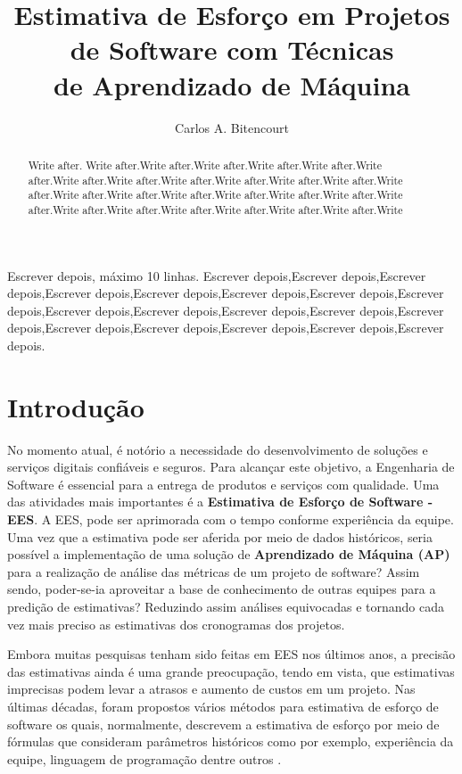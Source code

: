 \documentclass[12pt]{article}
\title{Estimativa de Esforço em Projetos de Software com Técnicas\\ de Aprendizado de Máquina}
\author{Carlos A. Bitencourt\inst{1}}
\begin{document}
\maketitle

\begin{abstract}
  Write after. Write after.Write after.Write after.Write after.Write after.Write after.Write after.Write after.Write after.Write after.Write after.Write after.Write after.Write after.Write after.Write after.Write after.Write after.Write after.Write after.Write after.Write after.Write after.Write after.Write after.Write after.Write
\end{abstract}

\begin{resumo}
  Escrever depois, máximo 10 linhas. Escrever depois,Escrever depois,Escrever depois,Escrever depois,Escrever depois,Escrever depois,Escrever depois,Escrever depois,Escrever depois,Escrever depois,Escrever depois,Escrever depois,Escrever depois,Escrever depois,Escrever depois,Escrever depois,Escrever depois,Escrever depois.

\end{resumo}

\section{Introdução}

No momento atual, é notório a necessidade do desenvolvimento de soluções e serviços digitais confiáveis e seguros. Para alcançar este objetivo, a Engenharia de Software é essencial para a entrega de produtos e serviços com qualidade. Uma das atividades mais importantes é a \textbf{Estimativa de Esforço de Software - EES}. A EES, pode ser aprimorada com o tempo conforme experiência da equipe. Uma vez que a estimativa pode ser aferida por meio de dados históricos, seria possível a implementação de uma solução de \textbf{Aprendizado de Máquina (AP)} para a realização de análise das métricas de um projeto de software? Assim sendo, poder-se-ia aproveitar a base de conhecimento de outras equipes para a predição de estimativas? Reduzindo assim análises equivocadas e tornando cada vez mais preciso as estimativas dos cronogramas dos projetos.

Embora muitas pesquisas tenham sido feitas em EES nos últimos anos, a precisão das estimativas  ainda é uma grande preocupação, tendo em vista, que estimativas imprecisas podem levar a atrasos e aumento de custos em um projeto. Nas últimas décadas, foram propostos vários métodos para estimativa de esforço de software os quais, normalmente, descrevem a estimativa de esforço por meio de fórmulas que consideram parâmetros históricos como por exemplo, experiência da equipe, linguagem de programação dentre outros \cite{asadegravino:2019}.
\end{document}
